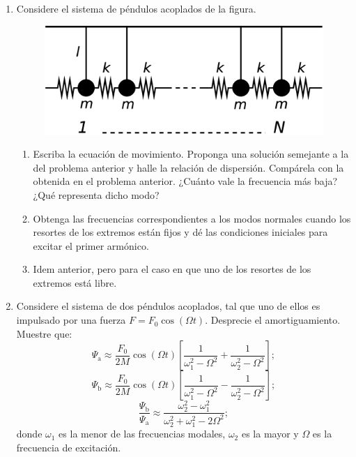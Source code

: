 \documentclass[11pt,spanish]{article}
\begin{document}
\begin{enumerate}

    \item Considere el sistema de péndulos acoplados de la figura. 
    
    \begin{figure}[H]
        \centering{}\includegraphics[clip,scale=0.25]{figs/ej1-12}
    \end{figure}


    \begin{enumerate}
        \item Escriba la ecuación de movimiento. Proponga una solución semejante
        a la del problema anterior y halle la relación de dispersión. Compárela
        con la obtenida en el problema anterior. ¿Cuánto vale la frecuencia
        más baja? ¿Qué representa dicho modo?

        \item Obtenga las frecuencias correspondientes a los modos normales
        cuando los resortes de los extremos están fijos y dé las condiciones
        iniciales para excitar el primer armónico.

        \item Idem anterior, pero para el caso en que uno de los resortes de los
        extremos está libre.
    \end{enumerate}


    \item Considere el sistema de dos péndulos acoplados, tal que uno de ellos
    es impulsado por una fuerza $F=F_{0}\cos(\Omega t)$. Desprecie el
    amortiguamiento. Muestre que:
    \[
    \Psi_\text{a}\approx\frac{F_{0}}{2M}\cos(\Omega t)\left[\frac{1}{\omega_{1}^{2}-\Omega^{2}}+\frac{1}{\omega_{2}^{2}-\Omega^{2}}\right];
    \]
    \[
    \Psi_\text{b}\approx\frac{F_{0}}{2M}\cos(\Omega t)\left[\frac{1}{\omega_{1}^{2}-\Omega^{2}}-\frac{1}{\omega_{2}^{2}-\Omega^{2}}\right];
    \]
    \[
    \frac{\Psi_\text{b}}{\Psi_\text{a}}\approx\frac{\omega_{2}^{2}-\omega_{1}^{2}}{\omega_{2}^{2}+\omega_{1}^{2}-2\Omega^{2}};
    \]
    donde $\omega_{1}$ es la menor de las frecuencias modales, $\omega_{2}$
    es la mayor y $\Omega$ es la frecuencia de excitación.


\end{enumerate}
\end{document}
